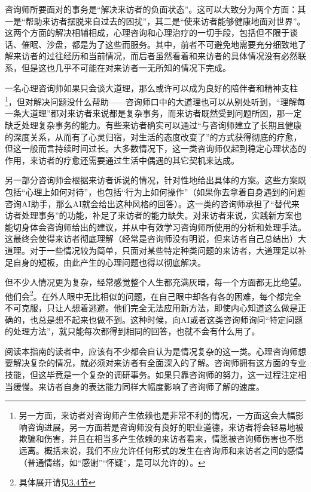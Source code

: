 咨询师所要面对的事务是“解决来访者的负面状态”。这可以大致分为两个方面：其一是“帮助来访者摆脱来自过去的困扰”，其二是“使来访者能够健康地面对世界”。这两个方面的解决相辅相成，心理咨询和心理治疗的一切手段，包括但不限于谈话、催眠、沙盘，都是为了这些而服务。其中，前者不可避免地需要充分细致地了解来访者的过往经历和当前情况，而后者虽然看着和来访者的具体情况没有必然联系，但是这也几乎不可能在对来访者一无所知的情况下完成。

一名心理咨询师如果只会谈大道理，那么或许可以成为良好的陪伴者和精神支柱\footnote{另一方面，来访者对咨询师产生依赖也是非常不利的情况，一方面这会大幅影响咨询进展，另一方面若是咨询师没有良好的职业道德，来访者将会轻易地被欺骗和伤害，并且在相当多产生依赖的来访者看来，情愿被咨询师伤害也不愿远离。概括来说，我们不应允许任何形式的发生在咨询师和来访者之间的感情（普通情绪，如“感谢”“怀疑”，是可以允许的）。}，但对解决问题没什么帮助——咨询师口中的大道理也可以从别处听到，“理解每一条大道理”都对来访者来说都是复杂事务，而来访者既然受到问题所困，那一定缺乏处理复杂事务的能力。有些来访者确实可以通过“与咨询师建立了长期且健康的深度关系，从而有了心灵归宿，对生活的态度改变了”的方式获得彻底的疗愈，但这一般而言持续时间过长。大多数情况下，这一类咨询师仅起到稳定心理状态的作用，来访者的疗愈还需要通过生活中偶遇的其它契机来达成。

另一部分咨询师会根据来访者诉说的情况，针对性地给出具体的方案。这些方案既包括“心理上如何对待”，也包括“行为上如何操作”（如果你去拿着自身遇到的问题咨询AI助手，那么AI就会给出这种风格的回答）。这一类的咨询师承担了“替代来访者处理事务”的功能，补足了来访者的能力缺失。对来访者来说，实践新方案也能切身体会咨询师给出的建议，并从中有效学习咨询师所使用的分析和处理手法。这最终会使得来访者彻底理解（经常是咨询师没有明说，但来访者自己总结出）大道理。对于一些情况较为简单，只面对某些特定种类问题的来访者，大道理足以补足自身的短板，由此产生的心理问题也得以彻底解决。

但不少人情况更为复杂，经常感觉整个人生都充满灰暗，每一个方面都无比绝望。他们会\footnote{具体展开请见\hyperref[sec:人的意识演化基本模型]{3.4节}}。在外人眼中无比相似的问题，在自己眼中却各有各的困难，每个都完全不可克服，只让人想着逃避。他们完全无法应用新方法，即使内心知道这么做是正确的，也总是想不起来也做不到。这种时候，向AI或者这类咨询师询问“特定问题的处理方法”，就只能每次都得到相同的回答，也就不会有什么用了。

阅读本指南的读者中，应该有不少都会自认为是情况复杂的这一类。心理咨询师想要解决复杂的情况，就必须对来访者有全面深入的了解。咨询师拥有这方面的专业技能，但这毕竟是一个复杂的调研事务。如果只靠咨询师的努力，这一过程注定相当缓慢。来访者自身的表达能力同样大幅度影响了咨询师了解的速度。

